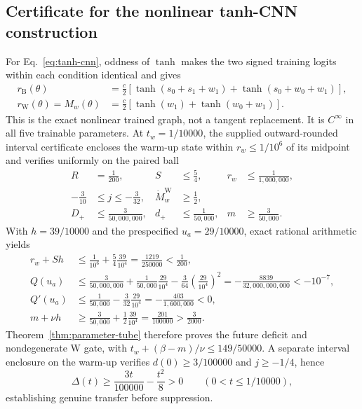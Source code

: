 \documentclass{article}
\theoremstyle{definition}
\theoremstyle{remark}
\newcommand{\Bcond}{\mathrm{B}}
\newcommand{\Wcond}{\mathrm{W}}
\begin{document}
\subsection{Certificate for the nonlinear tanh-CNN construction}
\label{app:proof-cor-nonlinear-cnn}
For Eq.~\eqref{eq:tanh-cnn}, oddness of $\tanh$ makes the two signed training logits within each condition identical and gives
\begin{equation}
 \begin{aligned}
  r_{\Bcond}(\theta)
  &=\frac c2\!\left[\tanh(s_0+s_1+w_1)+\tanh(s_0+w_0+w_1)\right],\\
  r_{\Wcond}(\theta)=M_w(\theta)
  &=\frac c2\!\left[\tanh(w_1)+\tanh(w_0+w_1)\right].
 \end{aligned}
 \label{eq:app-tanh-cnn-logits}
\end{equation}
This is the exact nonlinear trained graph, not a tangent replacement. It is $C^\infty$ in all five trainable parameters. At $t_w=1/10000$, the supplied outward-rounded interval certificate encloses the warm-up state within $r_w\le1/10^6$ of its midpoint and verifies uniformly on the paired ball
\begin{equation}
 \begin{aligned}
  R&=\frac1{200}, & S&\le\frac54, & r_w&\le\frac1{1{,}000{,}000},\\
  -\frac3{10}&\le j\le-\frac3{32}, &
  \dot M_w^{\Wcond}&\ge\frac12,\\
  D_+&\le\frac3{50{,}000{,}000}, &
  d_+&\le\frac1{50{,}000}, & m&\ge\frac3{50{,}000}.
 \end{aligned}
 \label{eq:app-tanh-cnn-bounds}
\end{equation}
With $h=39/10000$ and the prespecified $u_a=29/10000$, exact rational arithmetic yields
\begin{align}
 r_w+Sh&\le\frac1{10^6}+\frac54\frac{39}{10^4}=\frac{1219}{250000}<\frac1{200},\\
 Q(u_a)&\le\frac3{50{,}000{,}000}+\frac1{50{,}000}\frac{29}{10^4}
 -\frac3{64}\left(\frac{29}{10^4}\right)^2
 =-\frac{8839}{32{,}000{,}000{,}000}<-10^{-7},\\
 Q'(u_a)&\le\frac1{50{,}000}-\frac3{32}\frac{29}{10^4}
 =-\frac{403}{1{,}600{,}000}<0,\\
 m+\nu h&\ge\frac3{50{,}000}+\frac12\frac{39}{10^4}
 =\frac{201}{100000}>\frac3{2000}.
 \label{eq:app-tanh-cnn-arithmetic}
\end{align}
Theorem~\ref{thm:parameter-tube} therefore proves the future deficit and nondegenerate W gate, with
$t_w+(\beta-m)/\nu\le149/50000$. A separate interval enclosure on the warm-up verifies $d(0)\ge3/100000$ and $j\ge-1/4$, hence
\begin{equation}
 \Delta(t)\ge\frac{3t}{100000}-\frac{t^2}{8}>0
 \qquad(0<t\le1/10000),
 \label{eq:app-tanh-cnn-warmup}
\end{equation}
establishing genuine transfer before suppression.
\end{document}
